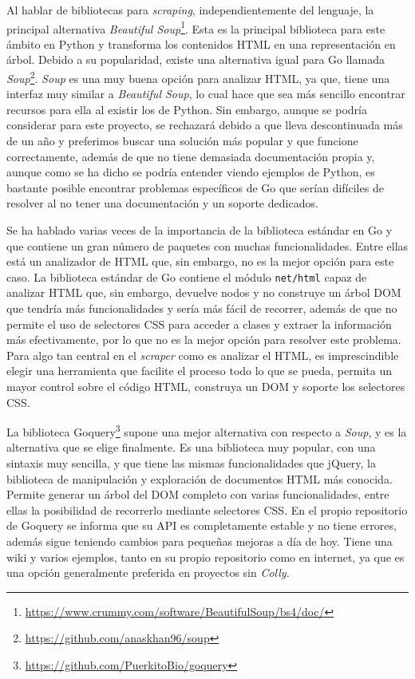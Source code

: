 Al hablar de bibliotecas para \textit{scraping}, independientemente del
lenguaje, la principal alternativa \textit{Beautiful
Soup}\footnote{\url{https://www.crummy.com/software/BeautifulSoup/bs4/doc/}}.
Esta es la principal biblioteca para este ámbito en Python y transforma los
contenidos HTML en una representación en árbol. Debido a su popularidad, existe
una alternativa igual para Go llamada
\textit{Soup}\footnote{\url{https://github.com/anaskhan96/soup}}. \textit{Soup}
es una muy buena opción para analizar HTML, ya que, tiene una interfaz muy
similar a \textit{Beautiful Soup}, lo cual hace que sea más sencillo encontrar
recursos para ella al existir los de Python. Sin embargo, aunque se podría
considerar para este proyecto, se rechazará debido a que lleva descontinuada más
de un año y preferimos buscar una solución más popular y que funcione
correctamente, además de que no tiene demasiada documentación propia y, aunque
como se ha dicho se podría entender viendo ejemplos de Python, es bastante
posible encontrar problemas específicos de Go que serían difíciles de resolver
al no tener una documentación y un soporte dedicados.

Se ha hablado varias veces de la importancia de la biblioteca estándar en Go y
que contiene un gran número de paquetes con muchas funcionalidades. Entre ellas
está un analizador de HTML que, sin embargo, no es la mejor opción para este
caso. La biblioteca estándar de Go contiene el módulo \texttt{net/html} capaz de
analizar HTML que, sin embargo, devuelve nodos y no construye un árbol DOM que
tendría más funcionalidades y sería más fácil de recorrer, además de que no
permite el uso de selectores CSS para acceder a clases y extraer la información
más efectivamente, por lo que no es la mejor opción para resolver este problema.
Para algo tan central en el \textit{scraper} como es analizar el HTML, es
imprescindible elegir una herramienta que facilite el proceso todo lo que se
pueda, permita un mayor control sobre el código HTML, construya un DOM y soporte
los selectores CSS.

La biblioteca Goquery\footnote{\url{https://github.com/PuerkitoBio/goquery}}
supone una mejor alternativa con respecto a \textit{Soup}, y es la alternativa
que se elige finalmente. Es una biblioteca muy popular, con una sintaxis muy
sencilla, y que tiene las mismas funcionalidades que jQuery, la biblioteca de
manipulación y exploración de documentos HTML más conocida. Permite generar un
árbol del DOM completo con varias funcionalidades, entre ellas la posibilidad de
recorrerlo mediante selectores CSS. En el propio repositorio de Goquery se
informa que su API es completamente estable y no tiene errores, además sigue
teniendo cambios para pequeñas mejoras a día de hoy. Tiene una wiki y varios
ejemplos, tanto en su propio repositorio como en internet, ya que es una opción
generalmente preferida en proyectos sin \textit{Colly}.

